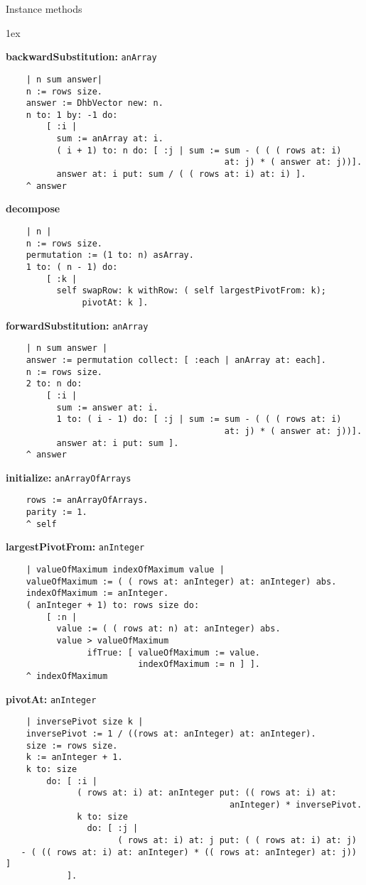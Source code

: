 Instance methods
{\parskip 1ex\par\noindent}
{\bf backwardSubstitution:} {\tt anArray}
\begin{verbatim}
    | n sum answer|
    n := rows size.
    answer := DhbVector new: n.
    n to: 1 by: -1 do:
        [ :i |
          sum := anArray at: i.
          ( i + 1) to: n do: [ :j | sum := sum - ( ( ( rows at: i) 
                                           at: j) * ( answer at: j))].
          answer at: i put: sum / ( ( rows at: i) at: i) ].
    ^ answer
\end{verbatim}
{\bf decompose}
\begin{verbatim}
    | n |
    n := rows size.
    permutation := (1 to: n) asArray.
    1 to: ( n - 1) do:
        [ :k |
          self swapRow: k withRow: ( self largestPivotFrom: k);
               pivotAt: k ].
\end{verbatim}
{\bf forwardSubstitution:} {\tt anArray}
\begin{verbatim}
    | n sum answer |
    answer := permutation collect: [ :each | anArray at: each].
    n := rows size.
    2 to: n do:
        [ :i |
          sum := answer at: i.
          1 to: ( i - 1) do: [ :j | sum := sum - ( ( ( rows at: i) 
                                           at: j) * ( answer at: j))].
          answer at: i put: sum ].
    ^ answer
\end{verbatim}
{\bf initialize:} {\tt anArrayOfArrays}
\begin{verbatim}
    rows := anArrayOfArrays.
    parity := 1.
    ^ self
\end{verbatim}
{\bf largestPivotFrom:} {\tt anInteger}
\begin{verbatim}
    | valueOfMaximum indexOfMaximum value |
    valueOfMaximum := ( ( rows at: anInteger) at: anInteger) abs.
    indexOfMaximum := anInteger.
    ( anInteger + 1) to: rows size do:
        [ :n |
          value := ( ( rows at: n) at: anInteger) abs.
          value > valueOfMaximum
                ifTrue: [ valueOfMaximum := value.
                          indexOfMaximum := n ] ].
    ^ indexOfMaximum 
\end{verbatim}
{\bf pivotAt:} {\tt anInteger}
\begin{verbatim}
    | inversePivot size k |
    inversePivot := 1 / ((rows at: anInteger) at: anInteger).
    size := rows size.
    k := anInteger + 1.
    k to: size
        do: [ :i |
              ( rows at: i) at: anInteger put: (( rows at: i) at: 
                                            anInteger) * inversePivot.
              k to: size
                do: [ :j |
                      ( rows at: i) at: j put: ( ( rows at: i) at: j) 
   - ( (( rows at: i) at: anInteger) * (( rows at: anInteger) at: j)) ]
            ].
\end{verbatim}
